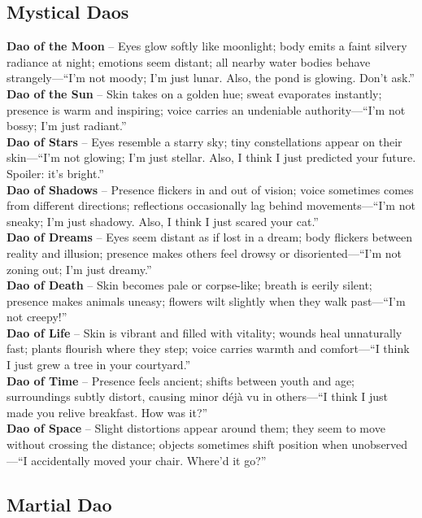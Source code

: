 \subsection{Mystical Daos}

\textbf{Dao of the Moon} – Eyes glow softly like moonlight; body emits a faint silvery radiance at night; emotions seem distant; all nearby water bodies behave strangely—“I’m not moody; I’m just lunar. Also, the pond is glowing. Don’t ask.” \\
\textbf{Dao of the Sun} – Skin takes on a golden hue; sweat evaporates instantly; presence is warm and inspiring; voice carries an undeniable authority—“I’m not bossy; I’m just radiant.” \\
\textbf{Dao of Stars} – Eyes resemble a starry sky; tiny constellations appear on their skin—“I’m not glowing; I’m just stellar. Also, I think I just predicted your future. Spoiler: it’s bright.” \\
\textbf{Dao of Shadows} – Presence flickers in and out of vision; voice sometimes comes from different directions; reflections occasionally lag behind movements—“I’m not sneaky; I’m just shadowy. Also, I think I just scared your cat.” \\
\textbf{Dao of Dreams} – Eyes seem distant as if lost in a dream; body flickers between reality and illusion; presence makes others feel drowsy or disoriented—“I’m not zoning out; I’m just dreamy.” \\
\textbf{Dao of Death} – Skin becomes pale or corpse-like; breath is eerily silent; presence makes animals uneasy; flowers wilt slightly when they walk past—“I’m not creepy!” \\
\textbf{Dao of Life} – Skin is vibrant and filled with vitality; wounds heal unnaturally fast; plants flourish where they step; voice carries warmth and comfort—“I think I just grew a tree in your courtyard.” \\
\textbf{Dao of Time} – Presence feels ancient; shifts between youth and age; surroundings subtly distort, causing minor déjà vu in others—“I think I just made you relive breakfast. How was it?” \\
\textbf{Dao of Space} – Slight distortions appear around them; they seem to move without crossing the distance; objects sometimes shift position when unobserved—“I accidentally moved your chair. Where’d it go?”

\subsection{Martial Dao}

